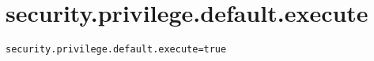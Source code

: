 \section{security.privilege.default.execute}
\label{configuration:SecurityPrivilegeDefaultExecute}
\ClearAPI
\TODO
{}
\begin{lstlisting}[style=Props,caption={Usage example for \textit{security.privilege.default.execute}}]
security.privilege.default.execute=true
\end{lstlisting}